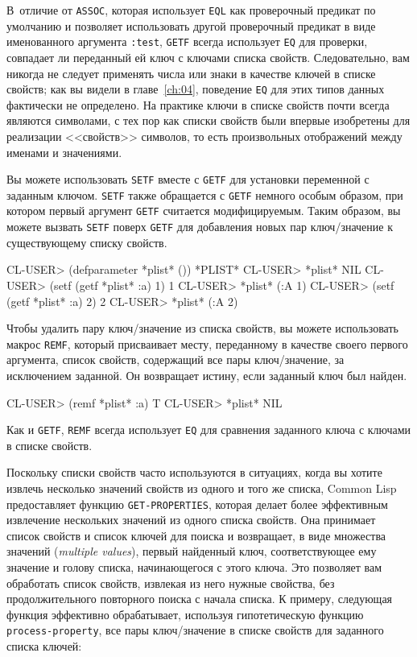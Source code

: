 В~отличие от \lstinline{ASSOC}, которая использует \lstinline{EQL} как проверочный предикат по
умолчанию и позволяет использовать другой проверочный предикат в виде именованного
аргумента \lstinline{:test}, \lstinline{GETF} всегда использует \lstinline{EQ} для проверки, совпадает ли
переданный ей ключ с ключами списка свойств. Следовательно, вам никогда не следует
применять числа или знаки в качестве ключей в списке свойств; как вы видели в
главе~\ref{ch:04}, поведение \lstinline{EQ} для этих типов данных фактически не определено. На
практике ключи в списке свойств почти всегда являются символами, с тех пор как списки
свойств были впервые изобретены для реализации <<свойств>> символов, то есть произвольных
отображений между именами и значениями.

Вы можете использовать \lstinline{SETF} вместе с \lstinline{GETF} для установки переменной с
заданным ключом. \lstinline{SETF} также обращается с \lstinline{GETF} немного особым образом, при
котором первый аргумент \lstinline{GETF} считается модифицируемым. Таким образом, вы можете
вызвать \lstinline{SETF} поверх \lstinline{GETF} для добавления новых пар ключ/значение к
существующему списку свойств.
  
\begin{myverb}
CL-USER> (defparameter *plist* ())
*PLIST*
CL-USER> *plist*
NIL
CL-USER> (setf (getf *plist* :a) 1)
1
CL-USER> *plist*
(:A 1)
CL-USER> (setf (getf *plist* :a) 2)
2
CL-USER> *plist*
(:A 2)
\end{myverb}

Чтобы удалить пару ключ/значение из списка свойств, вы можете использовать макрос
\lstinline{REMF}, который присваивает месту, переданному в качестве своего первого аргумента,
список свойств, содержащий все пары ключ/значение, за исключением заданной. Он возвращает
истину, если заданный ключ был найден.
  
\begin{myverb}
CL-USER> (remf *plist* :a)
T
CL-USER> *plist*
NIL
\end{myverb}

Как и \lstinline{GETF}, \lstinline{REMF} всегда использует \lstinline{EQ} для сравнения заданного ключа с
ключами в списке свойств.

Поскольку списки свойств часто используются в ситуациях, когда вы хотите извлечь несколько
значений свойств из одного и того же списка, Common Lisp предоставляет функцию
\lstinline{GET-PROPERTIES}, которая делает более эффективным извлечение нескольких значений из
одного списка свойств. Она принимает список свойств и список ключей для поиска и
возвращает, в виде множества значений (\textit{multiple values}), первый найденный ключ,
соответствующее ему значение и голову списка, начинающегося с этого ключа. Это позволяет
вам обработать список свойств, извлекая из него нужные свойства, без продолжительного
повторного поиска с начала списка.  К примеру, следующая функция эффективно обрабатывает,
используя гипотетическую функцию \lstinline{process-property}, все пары ключ/значение в списке
свойств для заданного списка ключей:

